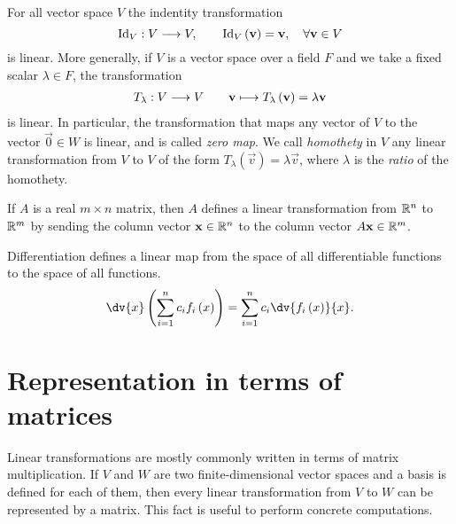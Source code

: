 \begin{example}
    For all vector space $V$ the indentity transformation
    \begin{equation}
        \mathrm{Id}_{V} : V\longrightarrow V,\quad\quad \mathrm{Id}_V\left( \mathbf{v} \right) = \mathbf{v},\quad \forall\mathbf{v}
        \in V
    \end{equation}
    is linear. More generally, if $V$ is a vector space over a field $F$ and we take a fixed scalar
    $\lambda\in F$, the transformation
    \begin{align}
        T_\lambda : V\longrightarrow V\quad\quad \mathbf{v}\longmapsto T_\lambda\left( \mathbf{v} \right) = \lambda\mathbf{v}
    \end{align}
    is linear. In particular, the transformation that maps any vector of $V$ to the vector $\vec{0}\in W$ is
    linear, and is called \textit{zero map}. We call \textit{homothety} in $V$ any linear transformation from
    $V$ to $V$ of the form $T_\lambda\left( \vec{v} \right) = \lambda\vec{v}$, where $\lambda$ is the
    \textit{ratio} of the homothety.
\end{example}

\begin{example}
    If $A$ is a real $m\times n$ matrix, then $A$ defines a linear transformation from $\mathbb{R}^n$ to $\mathbb{R}^m$ by
    sending the column vector $\mathbf{x}\in\mathbb{R}^n$ to the column vector $A\mathbf{x}\in\mathbb{R}^m$.
\end{example}

\begin{example}
    Differentiation defines a linear map from the space of all differentiable functions to the space of all
    functions.
    \begin{equation}
        \dv{x}\left( \sum_{i=1}^n c_i f_i\left( x \right)  \right) = \sum_{i=1}^n c_i\dv{f_i\left( x
        \right) }{x}.
    \end{equation}
\end{example}

\section{Representation in terms of matrices}
Linear transformations are mostly commonly written in terms of matrix multiplication. If $V$ and $W$ are two
finite-dimensional vector spaces and a basis is defined for each of them, then every linear transformation
from $V$ to $W$ can be represented by a matrix. This fact is useful to perform concrete computations.

